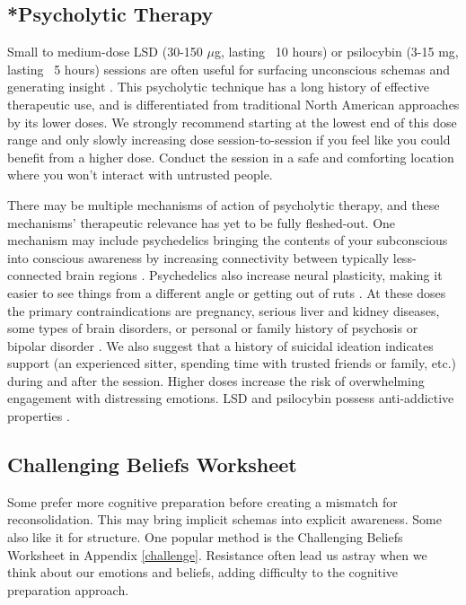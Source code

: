 \documentclass[12pt,letterpaper]{article}
\begin{document}
\subsection{*Psycholytic Therapy}
\label{psychedelics}
Small to medium-dose LSD (30-150 $\mu$g, lasting ~10 hours) or psilocybin (3-15 mg, lasting ~5 hours) sessions are often useful for surfacing unconscious schemas and generating insight \cite{passiePsycholytic}. This psycholytic technique has a long history of effective therapeutic use, and is differentiated from traditional North American approaches by its lower doses. We strongly recommend starting at the lowest end of this dose range and only slowly increasing dose session-to-session if you feel like you could benefit from a higher dose. Conduct the session in a safe and comforting location where you won't interact with untrusted people.


There may be multiple mechanisms of action of psycholytic therapy, and these mechanisms' therapeutic relevance has yet to be fully fleshed-out. One mechanism may include psychedelics bringing the contents of your subconscious into conscious awareness by increasing connectivity between typically less-connected brain regions \cite{linguiti2023functional}. Psychedelics also increase neural plasticity, making it easier to see things from a different angle or getting out of ruts \cite{nardou2023psychedelics}. At these doses the primary contraindications are pregnancy, serious liver and kidney diseases, some types of brain disorders, or personal or family history of psychosis or bipolar disorder \cite{schlagPsychedelicAdverseEffects,passiePsycholytic}. We also suggest that a history of suicidal ideation indicates support (an experienced sitter, spending time with trusted friends or family, etc.) during and after the session. Higher doses increase the risk of overwhelming engagement with distressing emotions. LSD and psilocybin possess anti-addictive properties \cite{principeAddiction}.
\subsection{Challenging Beliefs Worksheet}
\label{challengingBeliefsWorksheet}
Some prefer more cognitive preparation before creating a mismatch for reconsolidation.  This may bring implicit schemas into explicit awareness. Some also like it for structure. One popular method is the Challenging Beliefs Worksheet in Appendix \ref{challenge}. Resistance often lead us astray when we think about our emotions and beliefs, adding difficulty to the cognitive preparation approach.
\end{document}
